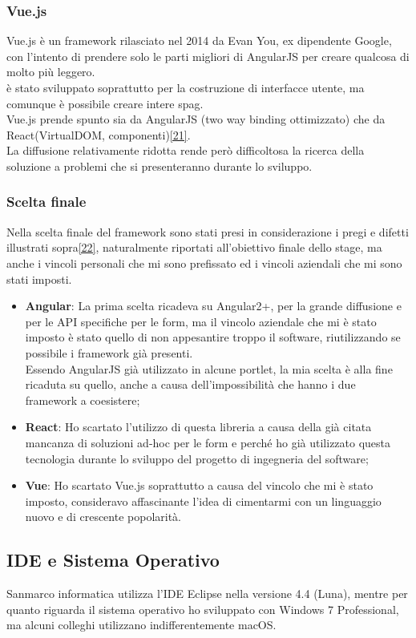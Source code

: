 \subsubsection{Vue.js}
Vue.js è un framework rilasciato nel 2014 da Evan You, ex dipendente Google, con l'intento di prendere solo le parti migliori di AngularJS per creare qualcosa di molto più leggero.\\
è stato sviluppato soprattutto per la costruzione di interfacce utente, ma comunque è possibile creare intere \gls{spag}.\\
Vue.js prende spunto sia da AngularJS (two way binding ottimizzato) che da React(VirtualDOM, componenti)\hyperlink{21}{[21]}. \\
La diffusione relativamente ridotta rende però difficoltosa la ricerca della soluzione a problemi che si presenteranno durante lo sviluppo.

\subsubsection{Scelta finale}
Nella scelta finale del framework sono stati presi in considerazione i pregi e difetti illustrati sopra\hyperlink{22}{[22]}, naturalmente riportati all'obiettivo finale dello stage, ma anche i vincoli personali che mi sono prefissato ed i vincoli aziendali che mi sono stati imposti.
\begin{itemize}
	\item \textbf{Angular}: La prima scelta ricadeva su Angular2+, per la grande diffusione e per le API specifiche per le form, ma il vincolo aziendale che mi è stato imposto è stato quello di non appesantire troppo il software, riutilizzando se possibile i \gls{framework} già presenti.\\
	Essendo AngularJS già utilizzato in alcune \gls{portlet}, la mia scelta è alla fine ricaduta su quello, anche a causa dell'impossibilità che hanno i due \gls{framework} a coesistere;
	\item \textbf{React}: Ho scartato l'utilizzo di questa libreria a causa della già citata mancanza di soluzioni ad-hoc per le form e perché ho già utilizzato questa tecnologia durante lo sviluppo del progetto di ingegneria del software;
	\item \textbf{Vue}: Ho scartato Vue.js soprattutto a causa del vincolo che mi è stato imposto, consideravo affascinante l'idea di cimentarmi con un linguaggio nuovo e di crescente popolarità.
\end{itemize}
\subsection{IDE e Sistema Operativo}
Sanmarco informatica utilizza l'IDE Eclipse nella versione 4.4 (Luna), mentre per quanto riguarda il sistema operativo ho sviluppato con Windows 7 Professional, ma alcuni colleghi utilizzano indifferentemente macOS.

